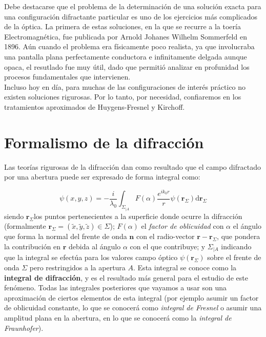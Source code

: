 \documentclass[12pt,a4paper]{book}
\numberwithin{equation}{section}
\numberwithin{figure}{section}
\newcommand{\D}{\mathrm{d}}
\newcommand{\1}{_{(1)}}
\newcommand{\2}{_{(2)}}
\newcommand{\rn}{\mathbf{r}}
\newcommand{\nn}{\mathbf{n}}
\theoremstyle{definition}
\begin{document}
Debe destacarse que el problema de la determinación de una solución exacta para una configuración difractante particular es uno de los ejercicios más complicados de la óptica. La primera de estas soluciones, en la que se recurre a la toería  Electromagnética, fue publicada por Arnold Johanes Wilhelm Sommerfeld en 1896. Aún cuando el problema era físicamente poco realista, ya que involucraba una pantalla plana perfectamente conductora e infinitamente delgada aunque opaca, el resutlado fue muy útil, dado que permitió analizar en profunidad los procesos fundamentales que intervienen. \\

Incluso hoy en día, para muchas de las configuraciones de interés práctico no existen soluciones rigurosas. Por lo tanto, por necesidad, confiaremos en los tratamientos aproximados de Huygens-Fresnel y Kirchoff. 

\section{Formalismo de la difracción}

Las teorías rigurosas de la difracción dan como resultado que el campo difractado por una abertura puede ser expresado de forma integral como:

\begin{equation}
    \psi (x,y,z) = - \frac{i}{\lambda_0} \int_{\Sigma_{|A}} F(\alpha) \frac{e^{ik_0r}}{r} \psi (\rn_\Sigma) \D \rn_\Sigma
\end{equation}
siendo $\rn_\Sigma$los puntos pertenecientes a la superficie donde ocurre la difracción (formalmente $\rn_\Sigma = (\tilde{x},\tilde{y}, \tilde{z}) \in \Sigma$); $F(\alpha)$ el \textit{factor de oblicuidad} con $\alpha$ el ángulo que forma la normal del frente de onda $\nn$ con el radio-vector $\rn-\rn_\Sigma$, que pondera la contribución en $\rn$ debida al ángulo $\alpha$ con el que contribuye; y $\Sigma_{|A}$ indicando que la integral se efectúa para los valores campo óptico $\psi(\rn_\Sigma)$ sobre el frente de onda $\Sigma$ pero restringidos a la apertura $A$. Esta integral se conoce como la \textbf{integral de difracción}, y es el resultado más general para el estudio de este fenómeno. Todas las integrales posteriores que vayamos a usar son una aproximación de ciertos elementos de esta integral (por ejemplo asumir un factor de oblicuidad constante, lo que se conocerá como \textit{integral de Fresnel} o asumir una amplitud plana en la abertura, en lo que se conocerá como la \textit{integral de Fraunhofer}). \\
\end{document}
